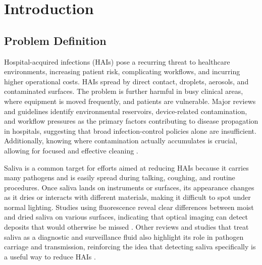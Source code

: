 {\section{Introduction}}

\subsection{Problem Definition}

Hospital-acquired infections (HAIs) pose a recurring threat to healthcare environments, increasing patient risk, complicating workflows, and incurring higher operational costs. HAIs spread by direct contact, droplets, aerosols, and contaminated surfaces. The problem is further harmful in busy clinical areas, where equipment is moved frequently, and patients are vulnerable. Major reviews and guidelines identify environmental reservoirs, device-related contamination, and workflow pressures as the primary factors contributing to disease propagation in hospitals, suggesting that broad infection-control policies alone are insufficient. Additionally, knowing where contamination actually accumulates is crucial, allowing for focused and effective cleaning \cite{allegranzi2011hand,loveday2014epic3,otter2013evidence,weber2013understanding,magill2014multistate}.

Saliva is a common target for efforts aimed at reducing HAIs because it carries many pathogens and is easily spread during talking, coughing, and routine procedures. Once saliva lands on instruments or surfaces, its appearance changes as it dries or interacts with different materials, making it difficult to spot under normal lighting. Studies using fluorescence reveal clear differences between moist and dried saliva on various surfaces, indicating that optical imaging can detect deposits that would otherwise be missed \cite{miranda2014fluorescence,wu2024quantitative}. Other reviews and studies that treat saliva as a diagnostic and surveillance fluid also highlight its role in pathogen carriage and transmission, reinforcing the idea that detecting saliva specifically is a useful way to reduce HAIs \cite{malamud2011saliva,to2020consistent,oliveira2024emergence}.


